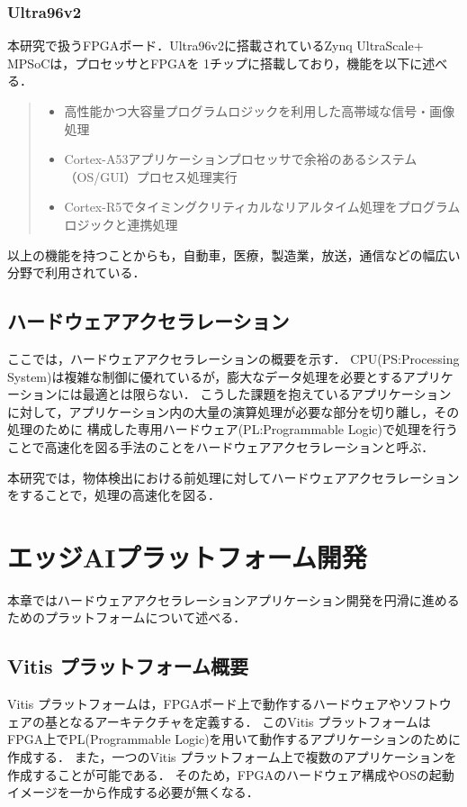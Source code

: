 \documentclass[11pt,a4j]{jreport}
\begin{document}
\subsection{Ultra96v2}
本研究で扱うFPGAボード．Ultra96v2に搭載されているZynq UltraScale+ MPSoC\cite{boardinfo}は，プロセッサとFPGAを
1チップに搭載しており，機能を以下に述べる．
\begin{quote}
  \begin{itemize}
    \item 高性能かつ大容量プログラムロジックを利用した高帯域な信号・画像処理
    \item Cortex-A53アプリケーションプロセッサで余裕のあるシステム（OS/GUI）プロセス処理実行
    \item Cortex-R5でタイミングクリティカルなリアルタイム処理をプログラムロジックと連携処理
  \end{itemize}
\end{quote}
以上の機能を持つことからも，自動車，医療，製造業，放送，通信などの幅広い分野で利用されている．

\section{ハードウェアアクセラレーション}
ここでは，ハードウェアアクセラレーション\cite{HWAccel}の概要を示す．
CPU(PS:Processing System)は複雑な制御に優れているが，膨大なデータ処理を必要とするアプリケーションには最適とは限らない．
こうした課題を抱えているアプリケーションに対して，アプリケーション内の大量の演算処理が必要な部分を切り離し，その処理のために
構成した専用ハードウェア(PL:Programmable Logic)で処理を行うことで高速化を図る手法のことをハードウェアアクセラレーションと呼ぶ．

本研究では，物体検出における前処理に対してハードウェアアクセラレーションをすることで，処理の高速化を図る．
%
\chapter{エッジAIプラットフォーム開発}
本章ではハードウェアアクセラレーションアプリケーション開発を円滑に進めるためのプラットフォームについて述べる．
\section{Vitis プラットフォーム概要}
Vitis プラットフォーム\cite{VitisPlatform}は，FPGAボード上で動作するハードウェアやソフトウェアの基となるアーキテクチャを定義する．
このVitis プラットフォームはFPGA上でPL(Programmable Logic)を用いて動作するアプリケーションのために作成する．
また，一つのVitis プラットフォーム上で複数のアプリケーションを作成することが可能である．
そのため，FPGAのハードウェア構成やOSの起動イメージを一から作成する必要が無くなる．
\end{document}
